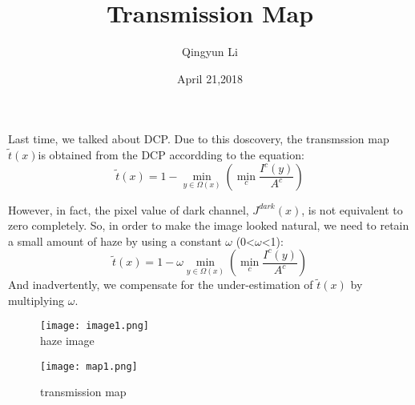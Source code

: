 \documentclass{article}
\author{Qingyun Li}
\date{April 21,2018}
\title{Transmission Map}
\begin{document}
\maketitle
\par Last time, we talked about DCP. Due to this doscovery, the transmssion map$\tilde{t}(x) $is obtained from the DCP accordding to the equation:
\begin{equation}
\tilde{t}(x)=1-\min\limits_{y\in\Omega(x)}(\min\limits_{c}\frac{I^{c}(y)}{A^c})
\end{equation}
\par However, in fact, the pixel value of dark channel, $J^{dark}(x)$, is not equivalent to zero completely. So, in order to make the image looked natural, we need to retain a small amount of haze by using a constant $\omega$ (0<$\omega$<1):\begin{equation}
\tilde{t}(x)=1-\omega \min\limits_{y\in\Omega(x)}(\min\limits_{c}\frac{I^{c}(y)}{A^c})
\end{equation}
And inadvertently, we compensate for the under-estimation of $\tilde{t}(x)$ by multiplying $\omega$. 
\begin{figure}[htbp]
\begin{minipage}{0.5\linewidth}
\centering{}
\texttt{[image: image1.png]}\\
\caption{haze image}\label{image} 
\end{minipage}
\hfill
\begin{minipage}{0.5\linewidth}
\centering{}
\texttt{[image: map1.png]}\\
\caption{transmission map}\label{map}
\end{minipage} 
\end{figure}
\end{document}
